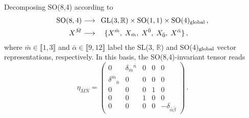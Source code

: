 \documentclass[11pt,a4paper]{article}
\newcommand{\bM}{{\bar{M}}}
\newcommand{\bN}{{\bar{N}}}
\newcommand{\bzero}{{\bar{0}}}
\newcommand{\balpha}{{\bar{\alpha}}}
\newcommand{\bbeta}{{\bar{\beta}}}
\begin{document}
Decomposing SO(8,4) according to 
%
\begin{equation}	\label{eq: gl3gradingbar}
	\begin{aligned}
		\text{SO}(8,4)	&\longrightarrow	\enspace \text{GL}(3,\mathbb{R})\times\text{SO}(1,1)\times\text{SO}(4)_{\rm global}\,,	\\
		X^{\bM}		&\longrightarrow	\quad \{X^{\bar m},\; X_{\bar m},\; X^\bzero,\; X_\bzero,\; X^\balpha\}\,,
	\end{aligned}
\end{equation}
where $\bar m\in\llbracket1,3\rrbracket$ and $\balpha\in\llbracket9,12\rrbracket$ label the SL(3, $\mathbb{R}$) and SO(4)$_{\rm global}$ vector representations, respectively. In this basis, the SO(8,4)-invariant tensor reads
%
\begin{equation}	\label{eq: Paulieta}
	\eta_{\bM\bN}=
	\begin{pmatrix}
		0 & \delta_{\bar m}{}^{\bar n} & 0 & 0 &0\\
		\delta^{\bar m}{}_{\bar n} & 0 & 0 & 0 &0\\
		0 & 0 & 0 & 1 & 0\\
		0 & 0 & 1 & 0 & 0\\
		0 & 0 & 0 & 0 & -\delta_{\balpha\bbeta}
	\end{pmatrix}\,.
\end{equation}
\end{document}
